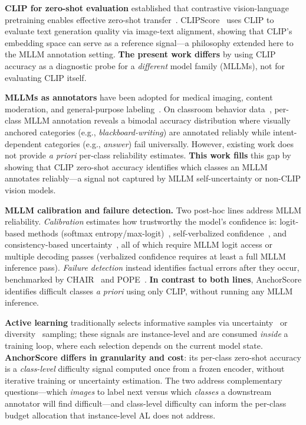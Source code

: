 \documentclass[11pt,a4paper]{article}
\begin{document}
\textbf{CLIP for zero-shot evaluation} established that contrastive vision-language pretraining enables effective zero-shot transfer~\cite{radford2021clip}. CLIPScore~\cite{hessel2021clipscore} uses CLIP to evaluate text generation quality via image-text alignment, showing that CLIP's embedding space can serve as a reference signal---a philosophy extended here to the MLLM annotation setting. \textbf{The present work differs} by using CLIP accuracy as a diagnostic probe for a \emph{different} model family (MLLMs), not for evaluating CLIP itself.

\textbf{MLLMs as annotators} have been adopted for medical imaging, content moderation, and general-purpose labeling~\cite{liu2023visual}. On classroom behavior data~\cite{ma2026agreement}, per-class MLLM annotation reveals a bimodal accuracy distribution where visually anchored categories (e.g., \emph{blackboard-writing}) are annotated reliably while intent-dependent categories (e.g., \emph{answer}) fail universally. However, existing work does not provide \emph{a priori} per-class reliability estimates. \textbf{This work fills} this gap by showing that CLIP zero-shot accuracy identifies which classes an MLLM annotates reliably---a signal not captured by MLLM self-uncertainty or non-CLIP vision models.

\textbf{MLLM calibration and failure detection.} Two post-hoc lines address MLLM reliability. \emph{Calibration} estimates how trustworthy the model's confidence is: logit-based methods (softmax entropy/\allowbreak max-logit)~\cite{kadavath2022language}, self-verbalized confidence~\cite{tian2023just}, and consistency-based uncertainty~\cite{kuhn2023semantic}, all of which require MLLM logit access or multiple decoding passes (verbalized confidence requires at least a full MLLM inference pass). \emph{Failure detection} instead identifies factual errors after they occur, benchmarked by CHAIR~\cite{rohrbach2018chair} and POPE~\cite{li2023pope}. \textbf{In contrast to both lines}, AnchorScore identifies difficult classes \emph{a priori} using only CLIP, without running any MLLM inference.

\textbf{Active learning} traditionally selects informative samples via uncertainty~\cite{settles2009active} or diversity~\cite{sener2018active} sampling; these signals are instance-level and are consumed \emph{inside} a training loop, where each selection depends on the current model state. \textbf{AnchorScore differs in granularity and cost}: its per-class zero-shot accuracy is a \emph{class-level} difficulty signal computed once from a frozen encoder, without iterative training or uncertainty estimation. The two address complementary questions---which \emph{images} to label next versus which \emph{classes} a downstream annotator will find difficult---and class-level difficulty can inform the per-class budget allocation that instance-level AL does not address.
\end{document}
